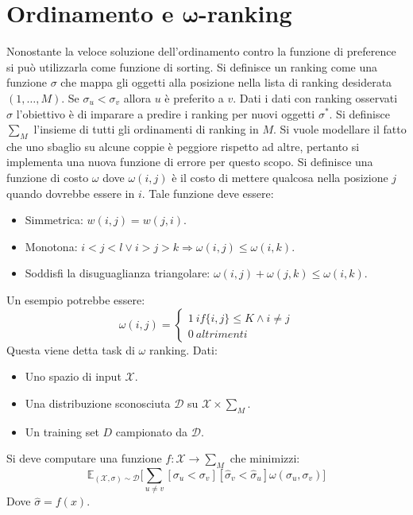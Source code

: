 \section{Ordinamento e $\mathbf{\omega}$-ranking}
Nonostante la veloce soluzione dell'ordinamento contro la funzione di preference si pu\`o utilizzarla come funzione di sorting.
Si definisce un ranking come una funzione $\sigma$ che mappa gli oggetti alla posizione nella lista di ranking desiderata $(1,\dots,M)$.
Se $\sigma_u < \sigma_v$ allora $u$ \`e preferito a $v$.
Dati i dati con ranking osservati $\sigma$ l'obiettivo \`e di imparare a predire i ranking per nuovi oggetti $\sigma^*$.
Si definisce $\sum_M$ l'insieme di tutti gli ordinamenti di ranking in $M$.
Si vuole modellare il fatto che uno sbaglio su alcune coppie \`e peggiore rispetto ad altre, pertanto si implementa una nuova funzione di errore per questo scopo.
Si definisce una funzione di costo $\omega$ dove $\omega(i,j)$ \`e il costo di mettere qualcosa nella posizione $j$ quando dovrebbe essere in $i$.
Tale funzione deve essere:
\begin{multicols}{2}
	\begin{itemize}
		\item Simmetrica: $w(i,j) = w(j,i)$.
		\item Monotona: $i<j<l\lor i>j>k \Rightarrow \omega(i,j) \le \omega(i,k)$.
		\item Soddisfi la disuguaglianza triangolare: $\omega(i,j)+\omega(j,k) \le \omega(i,k)$.
	\end{itemize}
\end{multicols}
Un esempio potrebbe essere:
$$\omega(i,j) = \begin{cases}1\ if\{i,j\} \le K \land i\neq j\\ 0\ altrimenti\end{cases}$$
Questa viene detta task di $\omega$ ranking.
Dati:
\begin{multicols}{2}
	\begin{itemize}
		\item Uno spazio di input $\mathcal{X}$.
		\item Una distribuzione sconosciuta $\mathcal{D}$ su $\mathcal{X}\times\sum_M$.
		\item Un training set $D$ campionato da $\mathcal{D}$.
	\end{itemize}
\end{multicols}
Si deve computare una funzione $f:\mathcal{X}\rightarrow\sum_M$ che minimizzi:
$$\mathbb{E}_{(\mathcal{X},\sigma)\sim\mathcal{D}}\biggl[\sum\limits_{u\neq v}[\sigma_u < \sigma_v][\hat{\sigma}_v < \hat{\sigma}_u]\omega(\sigma_u,\sigma_v)\biggr]$$
Dove $\hat{\sigma} = f(x)$.

